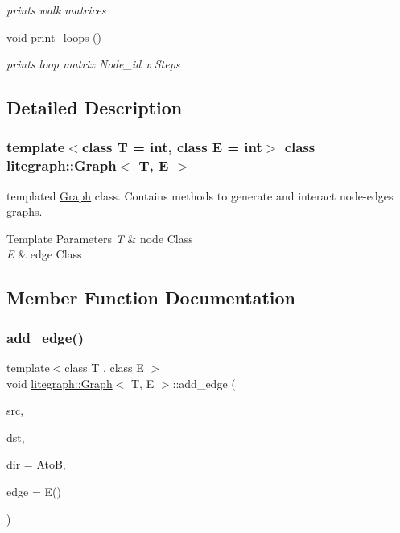 \begin{DoxyCompactItemize}
\begin{DoxyCompactList}\small\item\em prints walk matrices \end{DoxyCompactList}\item 
void \hyperlink{classlitegraph_1_1Graph_a1c505004169416bf4ede9e6ed3856ae0}{print\+\_\+loops} ()
\begin{DoxyCompactList}\small\item\em prints loop matrix Node\+\_\+id x Steps \end{DoxyCompactList}\end{DoxyCompactItemize}


\subsection{Detailed Description}
\subsubsection*{template$<$class T = int, class E = int$>$\newline
class litegraph\+::\+Graph$<$ T, E $>$}

templated \hyperlink{classlitegraph_1_1Graph}{Graph} class. Contains methods to generate and interact node-\/edges graphs. 


\begin{DoxyTemplParams}{Template Parameters}
{\em T} & node Class \\
\hline
{\em E} & edge Class \\
\hline
\end{DoxyTemplParams}


\subsection{Member Function Documentation}
\mbox{\label{classlitegraph_1_1Graph_ab99eb9988ddc5734afba373a97b44423}} 
\subsubsection{\texorpdfstring{add\+\_\+edge()}{add\_edge()}}
{\footnotesize\ttfamily template$<$class T , class E $>$ \\
void \hyperlink{classlitegraph_1_1Graph}{litegraph\+::\+Graph}$<$ T, E $>$\+::add\+\_\+edge (\begin{DoxyParamCaption}\item[{int}]{src,  }\item[{int}]{dst,  }\item[{dir\+\_\+t}]{dir = {\ttfamily AtoB},  }\item[{const E \&}]{edge = {\ttfamily E()} }\end{DoxyParamCaption})}



